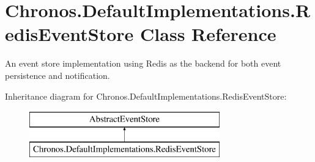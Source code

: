 \hypertarget{classChronos_1_1DefaultImplementations_1_1RedisEventStore}{}\section{Chronos.\+Default\+Implementations.\+Redis\+Event\+Store Class Reference}
\label{classChronos_1_1DefaultImplementations_1_1RedisEventStore}


An event store implementation using Redis as the backend for both event persistence and notification.  


Inheritance diagram for Chronos.\+Default\+Implementations.\+Redis\+Event\+Store\+:\begin{figure}[H]
\begin{center}
\leavevmode
\includegraphics[height=2.000000cm]{classChronos_1_1DefaultImplementations_1_1RedisEventStore}
\end{center}
\end{figure}

